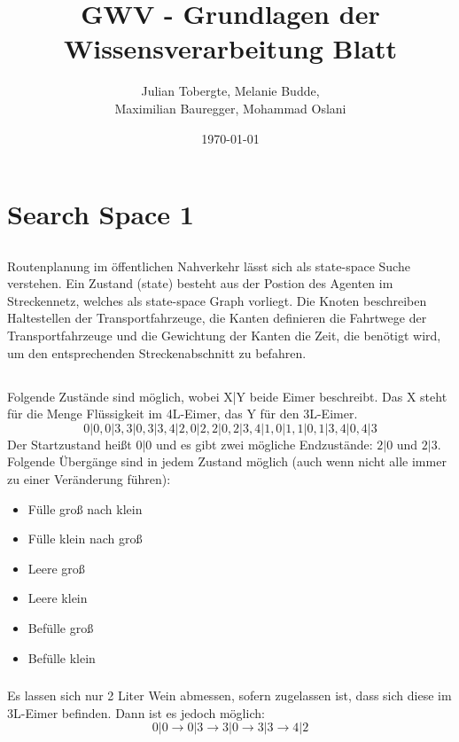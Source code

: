 \documentclass[DIV=12,numbers=noenddot]{scrartcl}
\title{GWV - Grundlagen der Wissensverarbeitung Blatt \arabic{blatt}}
\author{Julian Tobergte, Melanie Budde,\\Maximilian Bauregger, Mohammad Oslani}
\date{\today}
\begin{document}
	\maketitle
	\section{Search Space 1}
	\subsection{}
		Routenplanung im öffentlichen Nahverkehr lässt sich als state-space Suche verstehen. Ein Zustand (state) besteht aus der Postion des Agenten im Streckennetz, welches als state-space Graph vorliegt. Die Knoten beschreiben Haltestellen der Transportfahrzeuge, die Kanten definieren die Fahrtwege der Transportfahrzeuge und die Gewichtung der Kanten die Zeit, die benötigt wird, um den entsprechenden Streckenabschnitt zu befahren.
	\subsection{}
	\subsubsection{}
	Folgende Zustände sind möglich, wobei X|Y beide Eimer beschreibt. Das X steht für die Menge Flüssigkeit im 4L-Eimer, das Y für den 3L-Eimer.
	\[0|0 , 0|3 , 3|0 , 3|3 , 4|2 , 0|2 , 2|0 , 2|3 , 4|1 , 0|1 , 1|0 , 1|3 , 4|0 , 4|3\]
    Der Startzustand heißt $0|0$ und es gibt zwei mögliche Endzustände: $2|0$ und $2|3$. Folgende Übergänge sind in jedem Zustand möglich (auch wenn nicht alle immer zu einer Veränderung führen):
	\begin{itemize}
		\item Fülle groß nach klein
		\item Fülle klein nach groß
		\item Leere groß
		\item Leere klein
		\item Befülle groß
		\item Befülle klein
	\end{itemize}
	\subsubsection{}
		Es lassen sich nur 2 Liter Wein abmessen, sofern zugelassen ist, dass sich diese im 3L-Eimer befinden. Dann ist es jedoch möglich:
		\[0|0 \to 0|3 \to 3|0 \to 3|3 \to 4|2\] 
  
\end{document}
